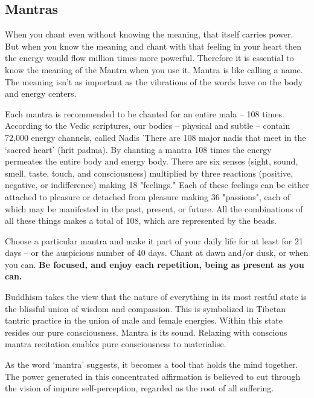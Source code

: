 
\begin{intersong}
  \section*{Mantras} %
  
  When you chant even without knowing the meaning, that itself carries power. But when you know 
  the meaning and chant with that feeling in your heart then the energy would flow million times 
  more powerful. Therefore it is essential to know the meaning of the Mantra when you use it. 
  Mantra is like calling a name. The meaning isn't as important as the vibrations of the words 
  have on the body and energy centers.

  Each mantra is recommended to be chanted for an entire mala – 108 times. According to the Vedic 
  scriptures, our bodies –  physical and subtle – contain 72,000 energy channels, called Nadis 
  ’There are 108 major nadis that meet in the ‘sacred heart’ (hrit padma). By chanting a mantra 
  108 times the energy permeates the entire body and energy body.  There are six senses (sight, 
  sound, smell, taste, touch, and consciousness) multiplied by three reactions (positive, 
  negative, or indifference) making 18 "feelings." Each of these feelings can be either attached 
  to pleasure or detached from pleasure making 36 "passions", each of which may be manifested in 
  the past, present, or future. All the combinations of all these things makes a total of 108, 
  which are represented by the beads.

  Choose a particular mantra and make it part of your daily life for at least for 21 days – or 
  the auspicious number of 40 days. Chant at dawn and/or dusk, or when you can. 
  \textbf{Be focused, and enjoy each repetition, being as present as you can.}

  Buddhism takes the view that the nature of everything in its most restful state is the blissful 
  union of wisdom and compassion. This is symbolized in Tibetan tantric practice in the union of 
  male and female energies. Within this state resides our pure consciousness. Mantra is its sound. 
  Relaxing with conscious mantra recitation enables pure consciousness to materialise. 

  As the word ‘mantra’ suggests, it becomes a tool that holds the mind together. The power 
  generated in this concentrated affirmation is believed to cut through the vision of impure 
  self-perception, regarded as the root of all suffering.  
  

\end{intersong}
